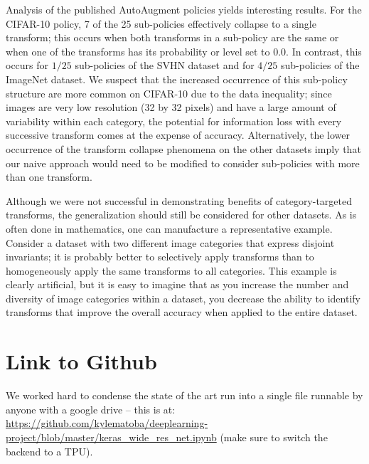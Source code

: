 \documentclass[10pt,twocolumn,letterpaper]{article}
\begin{document}
  Analysis of the published AutoAugment policies yields interesting results. For the CIFAR-10 policy, 7 of the 25 sub-policies effectively collapse to a single transform; this occurs when both transforms in a sub-policy are the same or when one of the transforms has its probability or level set to $0.0$. In contrast, this occurs for $1/25$ sub-policies of the SVHN dataset and for $4/25$ sub-policies of the ImageNet dataset. We suspect that the increased occurrence of this sub-policy structure are more common on CIFAR-10 due to the data inequality; since images are very low resolution (32 by 32 pixels) and have a large amount of variability within each category, the potential for information loss with every successive transform comes at the expense of accuracy. Alternatively, the lower occurrence of the transform collapse phenomena on the other datasets imply that our naive approach would need to be modified to consider sub-policies with more than one transform. 

  Although we were not successful in demonstrating benefits of category-targeted transforms, the generalization should still be considered for other datasets. As is often done in mathematics, one can manufacture a representative example. Consider a dataset with two different image categories that express disjoint invariants; it is probably better to selectively apply transforms than to homogeneously apply the same transforms to all categories. This example is clearly artificial, but it is easy to imagine that as you increase the number and diversity of image categories within a dataset, you decrease the ability to identify transforms that improve the overall accuracy when applied to the entire dataset.

% 
 
\section{Link to Github}

  We worked hard to condense the state of the art run into a single file runnable by anyone with a google drive -- this is at: \url{https://github.com/kylematoba/deeplearning-project/blob/master/keras_wide_res_net.ipynb} (make sure to switch the backend to a TPU).
\end{document}
